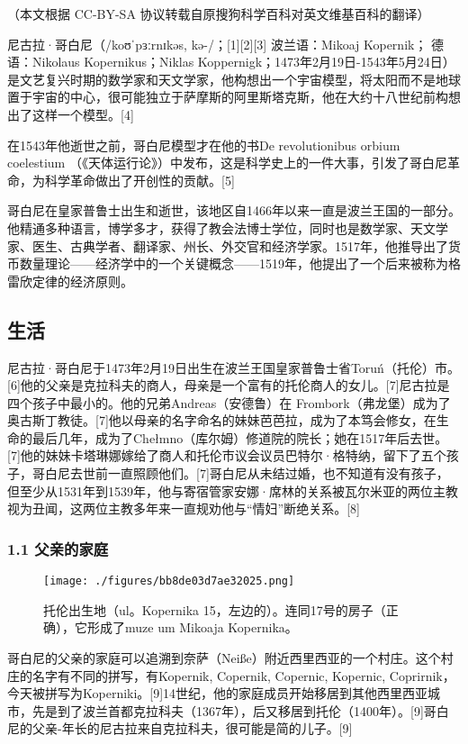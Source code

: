 
（本文根据 CC-BY-SA 协议转载自原搜狗科学百科对英文维基百科的翻译）

尼古拉·哥白尼（/koʊˈpɜːrnɪkəs, kə-/；[1][2][3] 波兰语：Mikoaj Kopernik； 德语：Nikolaus Kopernikus；Niklas Koppernigk；1473年2月19日-1543年5月24日）是文艺复兴时期的数学家和天文学家，他构想出一个宇宙模型，将太阳而不是地球置于宇宙的中心，很可能独立于萨摩斯的阿里斯塔克斯，他在大约十八世纪前构想出了这样一个模型。[4]

在1543年他逝世之前，哥白尼模型才在他的书De revolutionibus orbium coelestium （《天体运行论》）中发布，这是科学史上的一件大事，引发了哥白尼革命，为科学革命做出了开创性的贡献。[5]

哥白尼在皇家普鲁士出生和逝世，该地区自1466年以来一直是波兰王国的一部分。他精通多种语言，博学多才，获得了教会法博士学位，同时也是数学家、天文学家、医生、古典学者、翻译家、州长、外交官和经济学家。1517年，他推导出了货币数量理论——经济学中的一个关键概念——1519年，他提出了一个后来被称为格雷欣定律的经济原则。

\subsection{生活}
尼古拉·哥白尼于1473年2月19日出生在波兰王国皇家普鲁士省Toruń（托伦）市。[6]他的父亲是克拉科夫的商人，母亲是一个富有的托伦商人的女儿。[7]尼古拉是四个孩子中最小的。他的兄弟Andreas（安德鲁）在 Frombork（弗龙堡）成为了奥古斯丁教徒。[7]他以母亲的名字命名的妹妹芭芭拉，成为了本笃会修女，在生命的最后几年，成为了Chełmno（库尔姆）修道院的院长；她在1517年后去世。[7]他的妹妹卡塔琳娜嫁给了商人和托伦市议会议员巴特尔·格特纳，留下了五个孩子，哥白尼去世前一直照顾他们。[7]哥白尼从未结过婚，也不知道有没有孩子，但至少从1531年到1539年，他与寄宿管家安娜·席林的关系被瓦尔米亚的两位主教视为丑闻，这两位主教多年来一直规劝他与“情妇”断绝关系。[8]

\subsubsection{1.1 父亲的家庭}
\begin{figure}[ht]
\centering
\texttt{[image: ./figures/bb8de03d7ae32025.png]}
\caption{托伦出生地（ul。Kopernika 15，左边的）。连同17号的房子（正确），它形成了muze um Mikoaja Kopernika。} \label{fig_GBN_1}
\end{figure}

哥白尼的父亲的家庭可以追溯到奈萨（Neiße）附近西里西亚的一个村庄。这个村庄的名字有不同的拼写，有Kopernik, Copernik, Copernic, Kopernic, Coprirnik，今天被拼写为Koperniki。[9]14世纪，他的家庭成员开始移居到其他西里西亚城市，先是到了波兰首都克拉科夫（1367年），后又移居到托伦（1400年）。[9]哥白尼的父亲-年长的尼古拉来自克拉科夫，很可能是简的儿子。[9]

